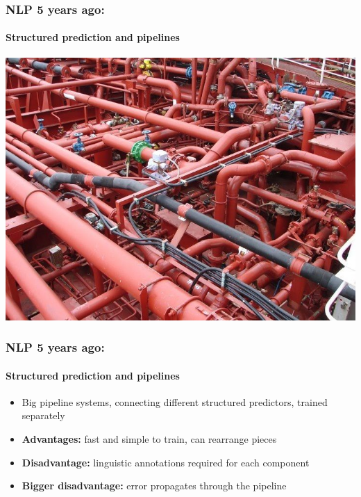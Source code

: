 \begin{frame}[plain]
\frametitle{NLP 5 years ago:}
\framesubtitle{Structured prediction and pipelines}

\begin{center}
\includegraphics[width=1.\columnwidth]{img/pipeline.jpg}
\end{center}

\end{frame}

\begin{frame}
\frametitle{NLP 5 years ago:}
\framesubtitle{Structured prediction and pipelines}

\begin{itemize}
\item Big pipeline systems, connecting different structured predictors, trained separately
\item {\bf Advantages:} fast and simple to train, can rearrange pieces 
\item<2-> {\bf Disadvantage:} linguistic annotations required for each component 
\item<3-> {\bf Bigger disadvantage:} error propagates through the pipeline 
\end{itemize}

\end{frame}


